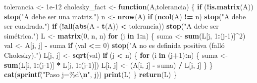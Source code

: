 \documentclass[
]{book}
\newenvironment{Shaded}{\begin{snugshade}}{\end{snugshade}}
\newcommand{\ControlFlowTok}[1]{\textcolor[rgb]{0.13,0.29,0.53}{\textbf{#1}}}
\newcommand{\DecValTok}[1]{\textcolor[rgb]{0.00,0.00,0.81}{#1}}
\newcommand{\FloatTok}[1]{\textcolor[rgb]{0.00,0.00,0.81}{#1}}
\newcommand{\FunctionTok}[1]{\textcolor[rgb]{0.13,0.29,0.53}{\textbf{#1}}}
\newcommand{\NormalTok}[1]{#1}
\newcommand{\OtherTok}[1]{\textcolor[rgb]{0.56,0.35,0.01}{#1}}
\newcommand{\SpecialCharTok}[1]{\textcolor[rgb]{0.81,0.36,0.00}{\textbf{#1}}}
\newcommand{\StringTok}[1]{\textcolor[rgb]{0.31,0.60,0.02}{#1}}
\begin{document}
\begin{Shaded}
\begin{Highlighting}[]
\NormalTok{tolerancia }\OtherTok{\textless{}{-}} \FloatTok{1e{-}12}
\NormalTok{cholesky\_fact }\OtherTok{\textless{}{-}} \ControlFlowTok{function}\NormalTok{(A,tolerancia) \{}
  \ControlFlowTok{if}\NormalTok{ (}\SpecialCharTok{!}\FunctionTok{is.matrix}\NormalTok{(A)) }\FunctionTok{stop}\NormalTok{(}\StringTok{"A debe ser una matriz."}\NormalTok{)}
\NormalTok{  n }\OtherTok{\textless{}{-}} \FunctionTok{nrow}\NormalTok{(A)}
  \ControlFlowTok{if}\NormalTok{ (}\FunctionTok{ncol}\NormalTok{(A) }\SpecialCharTok{!=}\NormalTok{ n) }\FunctionTok{stop}\NormalTok{(}\StringTok{"A debe ser cuadrada."}\NormalTok{)}
  \ControlFlowTok{if}\NormalTok{ (}\SpecialCharTok{!}\FunctionTok{all}\NormalTok{(}\FunctionTok{abs}\NormalTok{(A }\SpecialCharTok{{-}} \FunctionTok{t}\NormalTok{(A)) }\SpecialCharTok{\textless{}}\NormalTok{ tolerancia)) }\FunctionTok{stop}\NormalTok{(}\StringTok{"A debe ser simétrica."}\NormalTok{)}
\NormalTok{  L }\OtherTok{\textless{}{-}} \FunctionTok{matrix}\NormalTok{(}\DecValTok{0}\NormalTok{, n, n)}
  \ControlFlowTok{for}\NormalTok{ (j }\ControlFlowTok{in} \DecValTok{1}\SpecialCharTok{:}\NormalTok{n) \{}
\NormalTok{    suma }\OtherTok{\textless{}{-}} \FunctionTok{sum}\NormalTok{(L[j, }\DecValTok{1}\SpecialCharTok{:}\NormalTok{(j}\DecValTok{{-}1}\NormalTok{)]}\SpecialCharTok{\^{}}\DecValTok{2}\NormalTok{)}
\NormalTok{    val }\OtherTok{\textless{}{-}}\NormalTok{ A[j, j] }\SpecialCharTok{{-}}\NormalTok{ suma}
    \ControlFlowTok{if}\NormalTok{ (val }\SpecialCharTok{\textless{}=} \DecValTok{0}\NormalTok{) }\FunctionTok{stop}\NormalTok{(}\StringTok{"A no es definida positiva (falló Cholesky)."}\NormalTok{)}
\NormalTok{    L[j, j] }\OtherTok{\textless{}{-}} \FunctionTok{sqrt}\NormalTok{(val)}
    \ControlFlowTok{if}\NormalTok{ (j }\SpecialCharTok{\textless{}}\NormalTok{ n) \{}
      \ControlFlowTok{for}\NormalTok{ (i }\ControlFlowTok{in}\NormalTok{ (j}\SpecialCharTok{+}\DecValTok{1}\NormalTok{)}\SpecialCharTok{:}\NormalTok{n) \{}
\NormalTok{        suma }\OtherTok{\textless{}{-}} \FunctionTok{sum}\NormalTok{(L[i, }\DecValTok{1}\SpecialCharTok{:}\NormalTok{(j}\DecValTok{{-}1}\NormalTok{)] }\SpecialCharTok{*}\NormalTok{ L[j, }\DecValTok{1}\SpecialCharTok{:}\NormalTok{(j}\DecValTok{{-}1}\NormalTok{)])}
\NormalTok{        L[i, j] }\OtherTok{\textless{}{-}}\NormalTok{ (A[i, j] }\SpecialCharTok{{-}}\NormalTok{ suma) }\SpecialCharTok{/}\NormalTok{ L[j, j]}
\NormalTok{      \}}
\NormalTok{    \}}
    \FunctionTok{cat}\NormalTok{(}\FunctionTok{sprintf}\NormalTok{(}\StringTok{"Paso j=\%d}\SpecialCharTok{\textbackslash{}n}\StringTok{"}\NormalTok{, j))}
    \FunctionTok{print}\NormalTok{(L)}
\NormalTok{  \}}
  \FunctionTok{return}\NormalTok{(L)}
\NormalTok{\}}
\end{Highlighting}
\end{Shaded}
\end{document}
